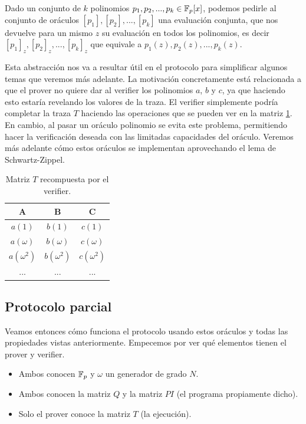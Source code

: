 Dado un conjunto de $k$ polinomios $p_1,p_2,...,p_k \in \mathbb{F}_p[x]$, podemos pedirle al conjunto de oráculos $[p_1], [p_2],..., [p_k]$ una evaluación conjunta, que nos devuelve para un mismo $z$ su evaluación en todos los polinomios, es decir $[p_1]_z, [p_2]_z,..., [p_k]_z$ que equivale a $p_1(z), p_2(z),...,p_k(z)$.

Esta abstracción nos va a resultar útil en el protocolo para simplificar algunos temas que veremos más adelante. La motivación concretamente está relacionada a que el prover no quiere dar al verifier los polinomios $a$, $b$ y $c$, ya que haciendo esto estaría revelando los valores de la traza. El verifier simplemente podría completar la traza $T$ haciendo las operaciones que se pueden ver en la matriz \ref{tab:matriz_t_trampa}. En cambio, al pasar un oráculo polinomio se evita este problema, permitiendo hacer la verificación deseada con las limitadas capacidades del oráculo. Veremos más adelante cómo estos oráculos se implementan aprovechando el lema de Schwartz-Zippel. 

\begin{table}
\begin{center}
\begin{tabular}{ccc}
\toprule
A & B & C \\
\midrule
$a(1)$ & $b(1)$ & $c(1)$ \\
$a(\omega)$ & $b(\omega)$ & $c(\omega)$ \\
$a(\omega^2)$ & $b(\omega^2)$ & $c(\omega^2)$ \\
... & ... & ... \\
\bottomrule
\end{tabular}
\caption{Matriz $T$ recompuesta por el verifier.}
\label{tab:matriz_t_trampa}
\end{center}
\end{table}

\subsection{Protocolo parcial}
Veamos entonces cómo funciona el protocolo usando estos oráculos y todas las propiedades vistas anteriormente. Empecemos por ver qué elementos tienen el prover y verifier.

\begin{itemize}
    \item Ambos conocen $\mathbb{F}_p$ y  $\omega$ un generador de grado $N$.
    \item Ambos conocen la matriz $Q$ y la matriz $PI$ (el programa propiamente dicho).
    \item Solo el prover conoce la matriz $T$ (la ejecución).
\end{itemize}

